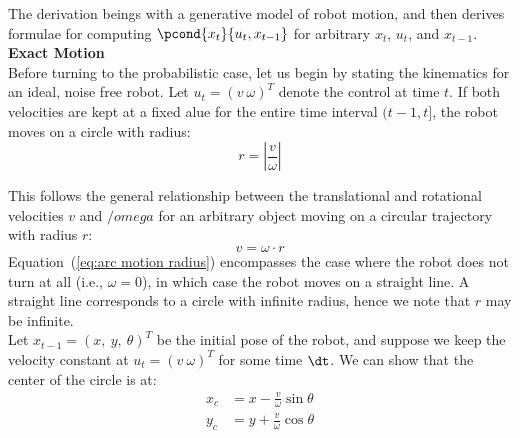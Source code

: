 The derivation beings with a generative model of robot motion, and then derives formulae for computing $\pcond{x_t}{u_t, x_{t-1}}$ for arbitrary $x_t$, $u_t$, and $x_{t-1}$.\\

\textbf{Exact Motion}\\

Before turning to the probabilistic case, let us begin by stating the kinematics for an ideal, noise free robot. Let $u_t = (v \ \omega)^T$ denote the control at time $t$.
If both velocities are kept at a fixed alue for the entire time interval $(t-1, t]$, the robot moves on a circle with radius:
\begin{equation}
  r= \left| \frac{v}{\omega} \right|
  \label{eq:arc motion radius}
\end{equation}

This follows the general relationship between the translational and rotational velocities $v$ and $/omega$ for an arbitrary object moving on a circular trajectory with radius $r$:
\begin{equation}
  v = \omega \cdot r
  \label{eq:linear to angular velocity}
\end{equation}
Equation~(\ref{eq:arc motion radius}) encompasses the case where the robot does not turn at all (i.e., $\omega=0$), in which case the robot moves on a straight line. A straight line corresponds to a circle with infinite radius, hence we note that $r$ may be infinite.\\

Let $x_{t-1} = (x,\ y,\ \theta)^T$ be the initial pose of the robot, and suppose we keep the velocity constant at $u_t = (v \ \omega)^T$ for some time $\dt$. We can show that the center of the circle is at:
\begin{align}
  x_c &= x - \frac{v}{\omega}\sin \theta \\
  y_c &= y + \frac{v}{\omega}\cos \theta
\end{align}

